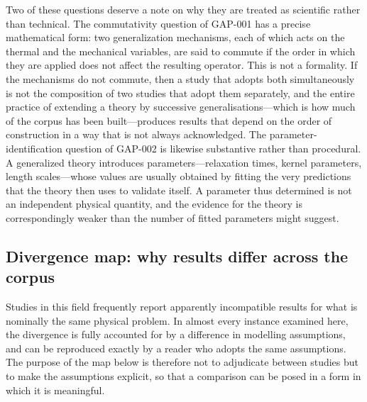 Two of these questions deserve a note on why they are treated as scientific rather than technical. The commutativity question of GAP-001 has a precise mathematical form: two generalization mechanisms, each of which acts on the thermal and the mechanical variables, are said to commute if the order in which they are applied does not affect the resulting operator. This is not a formality. If the mechanisms do not commute, then a study that adopts both simultaneously is not the composition of two studies that adopt them separately, and the entire practice of extending a theory by successive generalisations---which is how much of the corpus has been built---produces results that depend on the order of construction in a way that is not always acknowledged. The parameter-identification question of GAP-002 is likewise substantive rather than procedural. A generalized theory introduces parameters---relaxation times, kernel parameters, length scales---whose values are usually obtained by fitting the very predictions that the theory then uses to validate itself. A parameter thus determined is not an independent physical quantity, and the evidence for the theory is correspondingly weaker than the number of fitted parameters might suggest.

\subsection{Divergence map: why results differ across the corpus}
\label{sec:14.6}

Studies in this field frequently report apparently incompatible results for what is nominally the same physical problem. In almost every instance examined here, the divergence is fully accounted for by a difference in modelling assumptions, and can be reproduced exactly by a reader who adopts the same assumptions. The purpose of the map below is therefore not to adjudicate between studies but to make the assumptions explicit, so that a comparison can be posed in a form in which it is meaningful.

